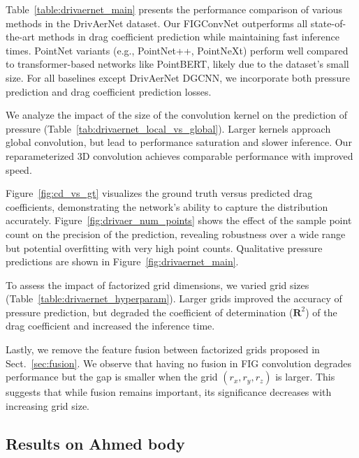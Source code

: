 Table~\ref{table:drivaernet_main} presents the performance comparison of various methods in the DrivAerNet dataset. Our FIGConvNet outperforms all state-of-the-art methods in drag coefficient prediction while maintaining fast inference times. PointNet variants (e.g., PointNet++, PointNeXt) perform well compared to transformer-based networks like PointBERT, likely due to the dataset's small size. For all baselines except DrivAerNet DGCNN, we incorporate both pressure prediction and drag coefficient prediction losses.

We analyze the impact of the size of the convolution kernel on the prediction of pressure (Table~\ref{tab:drivaernet_local_vs_global}). Larger kernels approach global convolution, but lead to performance saturation and slower inference. Our reparameterized 3D convolution achieves comparable performance with improved speed.

Figure~\ref{fig:cd_vs_gt} visualizes the ground truth versus predicted drag coefficients, demonstrating the network's ability to capture the distribution accurately. Figure~\ref{fig:drivaer_num_points} shows the effect of the sample point count on the precision of the prediction, revealing robustness over a wide range but potential overfitting with very high point counts. Qualitative pressure predictions are shown in Figure~\ref{fig:drivaernet_main}.

To assess the impact of factorized grid dimensions, we varied grid sizes (Table~\ref{table:drivaernet_hyperparam}). Larger grids improved the accuracy of pressure prediction, but degraded the coefficient of determination ($\mathbf{R}^2$) of the drag coefficient and increased the inference time.

Lastly, we remove the feature fusion between factorized grids proposed in Sect.~\ref{sec:fusion}. We observe that having no fusion in FIG convolution degrades performance but the gap is smaller when the grid $(r_x, r_y, r_z)$ is larger. This suggests that while fusion remains important, its significance decreases with increasing grid size.







\subsection{Results on Ahmed body}


